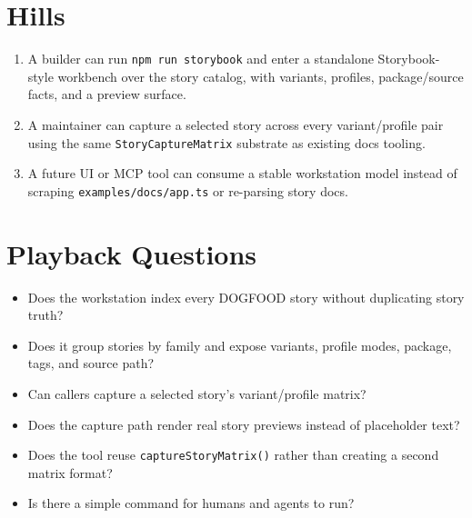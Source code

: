 \section{Hills}\label{record-088-hills}

\begin{enumerate}
\def\labelenumi{\arabic{enumi}.}
\tightlist
\item
  A builder can run \texttt{n\allowbreak{}p\allowbreak{}m\allowbreak{} \allowbreak{}r\allowbreak{}u\allowbreak{}n\allowbreak{} \allowbreak{}s\allowbreak{}t\allowbreak{}o\allowbreak{}r\allowbreak{}y\allowbreak{}b\allowbreak{}o\allowbreak{}o\allowbreak{}k} and enter a standalone Storybook-style workbench over the story catalog, with variants, profiles, package/source facts, and a preview surface.
\item
  A maintainer can capture a selected story across every variant/profile pair using the same \texttt{S\allowbreak{}t\allowbreak{}o\allowbreak{}r\allowbreak{}y\allowbreak{}C\allowbreak{}a\allowbreak{}p\allowbreak{}t\allowbreak{}u\allowbreak{}r\allowbreak{}e\allowbreak{}M\allowbreak{}a\allowbreak{}t\allowbreak{}r\allowbreak{}i\allowbreak{}x} substrate as existing docs tooling.
\item
  A future UI or MCP tool can consume a stable workstation model instead of scraping \texttt{e\allowbreak{}x\allowbreak{}a\allowbreak{}m\allowbreak{}p\allowbreak{}l\allowbreak{}e\allowbreak{}s\allowbreak{}/\allowbreak{}d\allowbreak{}o\allowbreak{}c\allowbreak{}s\allowbreak{}/\allowbreak{}a\allowbreak{}p\allowbreak{}p\allowbreak{}.\allowbreak{}t\allowbreak{}s} or re-parsing story docs.
\end{enumerate}

\section{Playback Questions}\label{record-088-playback-questions}

\begin{itemize}
\tightlist
\item
  Does the workstation index every DOGFOOD story without duplicating story truth?
\item
  Does it group stories by family and expose variants, profile modes, package, tags, and source path?
\item
  Can callers capture a selected story's variant/profile matrix?
\item
  Does the capture path render real story previews instead of placeholder text?
\item
  Does the tool reuse \texttt{c\allowbreak{}a\allowbreak{}p\allowbreak{}t\allowbreak{}u\allowbreak{}r\allowbreak{}e\allowbreak{}S\allowbreak{}t\allowbreak{}o\allowbreak{}r\allowbreak{}y\allowbreak{}M\allowbreak{}a\allowbreak{}t\allowbreak{}r\allowbreak{}i\allowbreak{}x\allowbreak{}(\allowbreak{})} rather than creating a second matrix format?
\item
  Is there a simple command for humans and agents to run?
\end{itemize}

